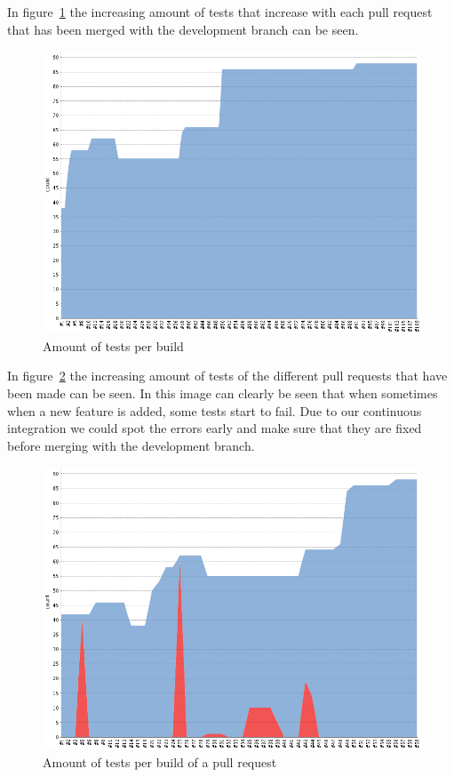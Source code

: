 In figure~\ref{testresulttrenddev} the increasing amount of tests that increase with each pull request that has been merged with the development branch can be seen.
\begin{figure}[H]
    \centering
    \includegraphics[width=\textwidth]{images/TestresultTrendDev2}
    \caption{Amount of tests per build}
    \label{testresulttrenddev}
\end{figure}

In figure~\ref{testresulttrendpullrequest} the increasing amount of tests of the different pull requests that have been made can be seen.
In this image can clearly be seen that when sometimes when a new feature is added, some tests start to fail.
Due to our continuous integration we could spot the errors early and make sure that they are fixed before merging with the development branch.

\begin{figure}[H]
    \centering
    \includegraphics[width=\textwidth]{images/TestresultTrendPullRequests}
    \caption{Amount of tests per build of a pull request}
    \label{testresulttrendpullrequest}
\end{figure}

